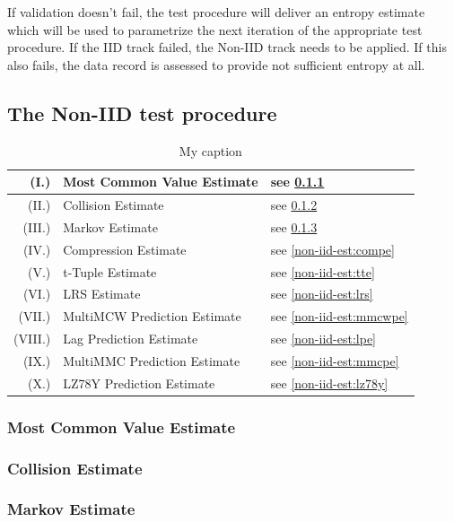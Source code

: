 If validation doesn't fail, the test procedure will deliver an entropy estimate which will be used to parametrize the next iteration of the appropriate test procedure. If the IID track failed, the Non-IID track needs to be applied. If this also fails, the data record is assessed to provide not sufficient entropy at all.

\subsection{The Non-IID test procedure}\label{sub:non-iid-test-proc}


\begin{table}[]
	\centering
	\caption{My caption}
	\label{my-label}
	\begin{tabular}{|r|l|l|}
		\hline
		(I.)& Most Common Value Estimate & see \ref{non-iid-est:mcve} \\ \hline
		(II.)& Collision Estimate & see \ref{non-iid-est:colle} \\ \hline
		(III.)& Markov Estimate & see \ref{non-iid-est:marke} \\ \hline
		(IV.)& Compression Estimate & see \ref{non-iid-est:compe} \\ \hline
		(V.)& t-Tuple Estimate & see \ref{non-iid-est:tte} \\ \hline
		(VI.)& LRS Estimate & see \ref{non-iid-est:lrs} \\ \hline
		(VII.)& MultiMCW Prediction Estimate & see \ref{non-iid-est:mmcwpe} \\ \hline
		(VIII.)& Lag Prediction Estimate & see \ref{non-iid-est:lpe} \\ \hline
		(IX.)& MultiMMC Prediction Estimate & see \ref{non-iid-est:mmcpe} \\ \hline
		(X.)& LZ78Y Prediction Estimate & see \ref{non-iid-est:lz78y} \\ \hline
	\end{tabular}
\end{table}

\subsubsection{Most Common Value Estimate}\label{non-iid-est:mcve}
\subsubsection{Collision Estimate}\label{non-iid-est:colle}
\subsubsection{Markov Estimate}\label{non-iid-est:marke}
